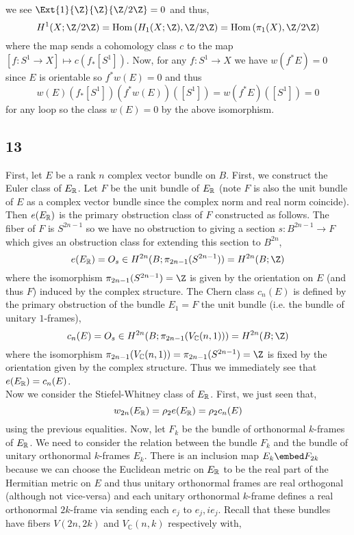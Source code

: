 \documentclass[12pt]{extarticle}
\newcommand{\C}{\mathbb{C}}
\begin{document}
we see $\Ext{1}{\Z}{\Z}{\Z/2\Z} = 0$ and thus,
\[ H^1(X; \Z / 2 \Z) = \Hom{H_1(X; \Z)}{\Z / 2 \Z} = \Hom{\pi_1(X)}{\Z / 2 \Z} \]
where the map sends a cohomology class $c$ to the map $[f : S^1 \to X] \mapsto c(f_*[S^1])$. 
Now, for any $f : S^1 \to X$ we have $w(f^* E) = 0$ since $E$ is orientable so $f^* w(E) = 0$ and thus
\[ w(E)(f_*[S^1]) (f^* w(E))([S^1]) = w(f^* E)([S^1]) = 0 \]
for any loop so the class $w(E) = 0$ by the above isomorphism. 

\subsection{13}

First, let $E$ be a rank $n$ complex vector bundle on $B$. First, we construct the Euler class of $E_{\mathbb{R}}$. Let $F$ be the unit bundle of $E_{\mathbb{R}}$ (note $F$ is also the unit bundle of $E$ as a complex vector bundle since the complex norm and real norm coincide). Then $e(E_{\mathbb{R}})$ is the primary obstruction class of $F$ constructed as follows. The fiber of $F$ is $S^{2n - 1}$ so we have no obstruction to giving a section $s : B^{2n-1} \to F$ which gives an obstruction class for extending this section to $B^{2n}$,
\[ e(E_\R) = O_s \in H^{2n}(B; \pi_{2n-1}(S^{2n - 1})) = H^{2n}(B; \Z) \]
where the isomorphism $\pi_{2n - 1}(S^{2n - 1}) = \Z$ is given by the orientation on $E$ (and thus $F$) induced by the complex structure. The Chern class $c_n(E)$ is defined by the primary obstruction of the bundle $E_1 = F$ the unit bundle (i.e. the bundle of unitary $1$-frames),
\[ c_n(E) = O_s \in H^{2n}(B; \pi_{2n - 1}(V_\C(n, 1))) = H^{2n}(B; \Z) \]
where the isomorphism $\pi_{2n-1} (V_\C(n,1)) = \pi_{2n-1}(S^{2n - 1}) = \Z$ is fixed by the orientation given by the complex structure. Thus we immediately see that $e(E_{\mathbb{R}}) = c_n(E)$. 
\bigskip\\
Now we consider the Stiefel-Whitney class of $E_{\mathbb{R}}$. First, we just seen that,
\[ w_{2n}(E_{\mathbb{R}}) = \rho_2 e(E_{\mathbb{R}}) = \rho_2 c_n(E) \]
using the previous equalities. Now, let $F_k$ be the bundle of orthonormal $k$-frames of $E_{\mathbb{R}}$. We need to consider the relation between the bundle $F_k$ and the bundle of unitary orthonormal $k$-frames $E_k$. There is an inclusion map $E_k \embed F_{2k}$ because we can choose the Euclidean metric on $E_{\mathbb{R}}$ to be the real part of the Hermitian metric on $E$ and thus unitary orthonormal frames are real orthogonal (although not vice-versa) and each unitary orthonormal $k$-frame defines a real orthonormal $2k$-frame via sending each $e_j$ to $e_j, i e_j$. Recall that these bundles have fibers $V(2n, 2k)$ and $V_\C(n, k)$ respectively with,
\end{document}

